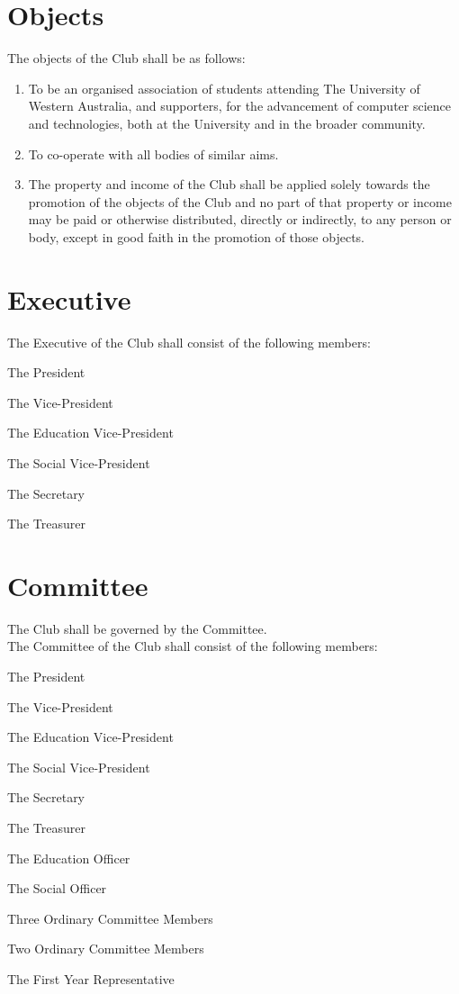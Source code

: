 \documentclass[11pt]{article} %
\begin{document}
\section{Objects}
The objects of the Club shall be as follows:
\begin{enumerate}
	\item To be an organised association of students attending The University of Western Australia, and supporters, for the advancement of computer science and technologies, both at the University and in the broader community.
	\item To co-operate with all bodies of similar aims.
	\item The property and income of the Club shall be applied solely towards the promotion of the objects of the Club and no part of that property or income may be paid or otherwise distributed, directly or indirectly, to any person or body, except in good faith in the promotion of those objects.
\end{enumerate}

\section{Executive}
The Executive of the Club shall consist of the following members:
\begin{enumerate}
	\item The President
	{\color{red} \item The Vice-President}
	{\color{ForestGreen} \item The Education Vice-President}
	{\color{ForestGreen} \item The Social Vice-President}
	\item The Secretary
	\item The Treasurer
\end{enumerate}

\section{Committee}
The Club shall be governed by the Committee.\\
The Committee of the Club shall consist of the following members:
\begin{enumerate}
	\item The President
	{\color{red} \item The Vice-President}
	{\color{ForestGreen} \item The Education Vice-President}
	{\color{ForestGreen} \item The Social Vice-President}
	\item The Secretary
	\item The Treasurer
	{\color{ForestGreen} \item The Education Officer}
	{\color{ForestGreen} \item The Social Officer}
	{\color{red} \item Three Ordinary Committee Members}
	{\color{ForestGreen} \item Two Ordinary Committee Members}
	\item The First Year Representative
\end{enumerate}
\end{document}
